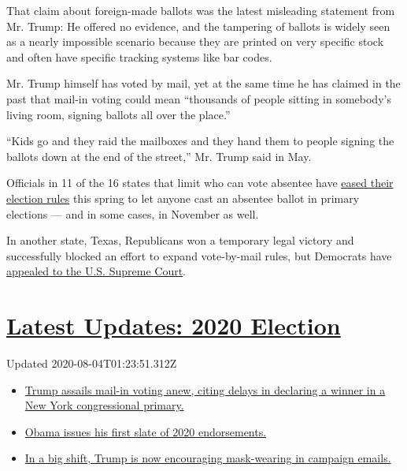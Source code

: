 That claim about foreign-made ballots was the latest misleading
statement from Mr. Trump: He offered no evidence, and the tampering of
ballots is widely seen as a nearly impossible scenario because they are
printed on very specific stock and often have specific tracking systems
like bar codes.

Mr. Trump himself has voted by mail, yet at the same time he has claimed
in the past that mail-in voting could mean ``thousands of people sitting
in somebody's living room, signing ballots all over the place.''

``Kids go and they raid the mailboxes and they hand them to people
signing the ballots down at the end of the street,'' Mr. Trump said in
May.

Officials in 11 of the 16 states that limit who can vote absentee have
\href{https://www.nytimes3xbfgragh.onion/2020/05/21/us/vote-by-mail-trump.html}{eased
their election rules} this spring to let anyone cast an absentee ballot
in primary elections --- and in some cases, in November as well.

In another state, Texas, Republicans won a temporary legal victory and
successfully blocked an effort to expand vote-by-mail rules, but
Democrats have
\href{https://www.texastribune.org/2020/06/16/texas-vote-by-mail/}{appealed
to the U.S. Supreme Court}.

\hypertarget{latest-updates-2020-election}{%
\section{\texorpdfstring{\href{https://www.nytimes3xbfgragh.onion/2020/08/03/us/elections/biden-vs-trump.html?action=click\&pgtype=Article\&state=default\&region=MAIN_CONTENT_1\&context=storylines_live_updates}{Latest
Updates: 2020
Election}}{Latest Updates: 2020 Election}}\label{latest-updates-2020-election}}

Updated 2020-08-04T01:23:51.312Z

\begin{itemize}
\tightlist
\item
  \href{https://www.nytimes3xbfgragh.onion/2020/08/03/us/elections/biden-vs-trump.html?action=click\&pgtype=Article\&state=default\&region=MAIN_CONTENT_1\&context=storylines_live_updates\#link-6494b448}{Trump
  assails mail-in voting anew, citing delays in declaring a winner in a
  New York congressional primary.}
\item
  \href{https://www.nytimes3xbfgragh.onion/2020/08/03/us/elections/biden-vs-trump.html?action=click\&pgtype=Article\&state=default\&region=MAIN_CONTENT_1\&context=storylines_live_updates\#link-3de249e6}{Obama
  issues his first slate of 2020 endorsements.}
\item
  \href{https://www.nytimes3xbfgragh.onion/2020/08/03/us/elections/biden-vs-trump.html?action=click\&pgtype=Article\&state=default\&region=MAIN_CONTENT_1\&context=storylines_live_updates\#link-54e34d20}{In
  a big shift, Trump is now encouraging mask-wearing in campaign
  emails.}
\end{itemize}

